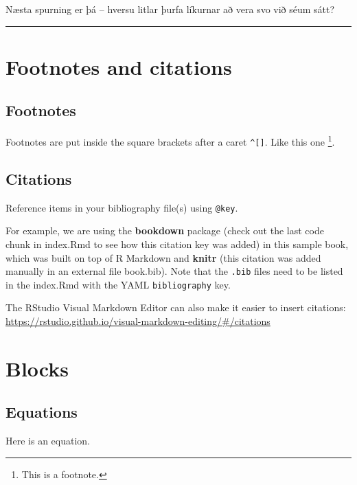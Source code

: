 \documentclass[
]{book}
\theoremstyle{definition}
\theoremstyle{definition}
\theoremstyle{definition}
\theoremstyle{definition}
\theoremstyle{remark}
\begin{document}
Næsta spurning er þá -- hversu litlar þurfa líkurnar að vera svo við séum sátt?

\begin{center}\rule{0.5\linewidth}{0.5pt}\end{center}

\hypertarget{footnotes-and-citations}{%
\chapter{Footnotes and citations}\label{footnotes-and-citations}}

\hypertarget{footnotes}{%
\section{Footnotes}\label{footnotes}}

Footnotes are put inside the square brackets after a caret \texttt{\^{}{[}{]}}. Like this one \footnote{This is a footnote.}.

\hypertarget{citations}{%
\section{Citations}\label{citations}}

Reference items in your bibliography file(s) using \texttt{@key}.

For example, we are using the \textbf{bookdown} package \citep{R-bookdown} (check out the last code chunk in index.Rmd to see how this citation key was added) in this sample book, which was built on top of R Markdown and \textbf{knitr} \citep{xie2015} (this citation was added manually in an external file book.bib). Note that the \texttt{.bib} files need to be listed in the index.Rmd with the YAML \texttt{bibliography} key.

The RStudio Visual Markdown Editor can also make it easier to insert citations: \url{https://rstudio.github.io/visual-markdown-editing/\#/citations}

\hypertarget{blocks}{%
\chapter{Blocks}\label{blocks}}

\hypertarget{equations}{%
\section{Equations}\label{equations}}

Here is an equation.
\end{document}

